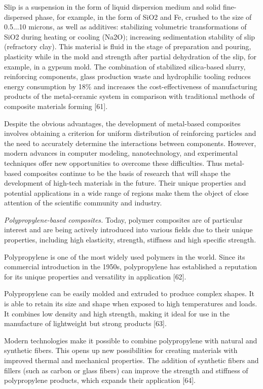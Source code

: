 \begin{multicols}{2}
Slip is a suspension in the form of liquid dispersion medium and solid
fine-dispersed phase, for example, in the form of SiO2 and Fe, crushed
to the size of 0.5...10 microns, as well as additives: stabilizing
volumetric transformations of SiO2 during heating or cooling (Na2O);
increasing sedimentation stability of slip (refractory clay). This
material is fluid in the stage of preparation and pouring, plasticity
while in the mold and strength after partial dehydration of the slip,
for example, in a gypsum mold. The combination of stabilized
silica-based slurry, reinforcing components, glass production waste and
hydrophilic tooling reduces energy consumption by 18\% and increases the
cost-effectiveness of manufacturing products of the metal-ceramic system
in comparison with traditional methods of composite materials forming
{[}61{]}.

Despite the obvious advantages, the development of metal-based
composites involves obtaining a criterion for uniform distribution of
reinforcing particles and the need to accurately determine the
interactions between components. However, modern advances in computer
modeling, nanotechnology, and experimental techniques offer new
opportunities to overcome these difficulties. Thus metal-based
composites continue to be the basis of research that will shape the
development of high-tech materials in the future. Their unique
properties and potential applications in a wide range of regions make
them the object of close attention of the scientific community and
industry.

\emph{Polypropylene-based composites.} Today, polymer composites are of
particular interest and are being actively introduced into various
fields due to their unique properties, including high elasticity,
strength, stiffness and high specific strength.

Polypropylene is one of the most widely used polymers in the world.
Since its commercial introduction in the 1950s, polypropylene has
established a reputation for its unique properties and versatility in
application {[}62{]}.

Polypropylene can be easily molded and extruded to produce complex
shapes. It is able to retain its size and shape when exposed to high
temperatures and loads. It combines low density and high strength,
making it ideal for use in the manufacture of lightweight but strong
products {[}63{]}.

Modern technologies make it possible to combine polypropylene with
natural and synthetic fibers. This opens up new possibilities for
creating materials with improved thermal and mechanical properties. The
addition of synthetic fibers and fillers (such as carbon or glass
fibers) can improve the strength and stiffness of polypropylene
products, which expands their application {[}64{]}.


\end{multicols}
